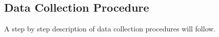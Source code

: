 \begin{comment}    
\subsection{Participants and Recruitment}
\textbf{Target population and study sample}

\textbf{Sample Size} 
 We were able to conduct 22 interviews, which we considered suitable, as this is an exploratory study of a certain implementation of a digital nudge interface, which aims to investigate users perception and experience. 

\textbf{Sampling technique /Recruitment}
    
    The study is limited to investigating how individuals with ability and motivation for physical activity (apparently), experience and perceive the digital nudges for physical activity. Hence, the sampling was non-randomized.
    
     The recruitment was done by standing at various SATS training centers in Oslo and actively recruiting people for the digital nudge trial / intervention. Information sheets was distributed, and consents where collected. In addition it was made sure that everyone signing up to participate had enabled push notifications through their app. In total, 105 participants registered to be a part of the study. Even though everyone agreed to take part in the following interview, we knew from experience from other research, that the actual participation rate is not very high. For that reason, we wanted to recruit as many participants as possible over a time period. 
        
    As the study followed an exploratory approach, it was also nice to have a good selection of participants, if it should be necessary to group/sort/filter them more.
    
\end{comment} 
 
\subsection{Data Collection Procedure}
A step by step description of data collection procedures will follow. 
    
